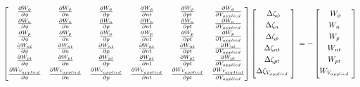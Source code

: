 \documentclass[11pt]{article}
\begin{document}
\begin{equation}
\begin{bmatrix}
\frac{\partial W_{\phi}}{\partial \phi} &
\frac{\partial W_{\phi}}{\partial n} &
\frac{\partial W_{\phi}}{\partial p} &
\frac{\partial W_{\phi}}{\partial nt} &
\frac{\partial W_{\phi}}{\partial pt} &
\frac{\partial W_{\phi}}{\partial V_{applied}} \\[0.3em]
\frac{\partial W_{n}}{\partial \phi} &
\frac{\partial W_{n}}{\partial n} &
\frac{\partial W_{n}}{\partial p} &
\frac{\partial W_{n}}{\partial nt} &
\frac{\partial W_{n}}{\partial pt} &
\frac{\partial W_{n}}{\partial V_{applied}} \\[0.3em]
\frac{\partial W_{p}}{\partial \phi} &
\frac{\partial W_{p}}{\partial n} &
\frac{\partial W_{p}}{\partial p} &
\frac{\partial W_{p}}{\partial nt} &
\frac{\partial W_{p}}{\partial pt} &
\frac{\partial W_{p}}{\partial V_{applied}} \\[0.3em]
\frac{\partial W_{nt}}{\partial \phi} &
\frac{\partial W_{nt}}{\partial n} &
\frac{\partial W_{nt}}{\partial p} &
\frac{\partial W_{nt}}{\partial nt} &
\frac{\partial W_{nt}}{\partial pt} &
\frac{\partial W_{nt}}{\partial V_{applied}} \\[0.3em]
\frac{\partial W_{pt}}{\partial \phi} &
\frac{\partial W_{pt}}{\partial n} &
\frac{\partial W_{pt}}{\partial p} &
\frac{\partial W_{pt}}{\partial nt} &
\frac{\partial W_{pt}}{\partial pt} &
\frac{\partial W_{pt}}{\partial V_{applied}} \\[0.3em]
\frac{\partial W_{V_{applied}}}{\partial \phi} &
\frac{\partial W_{V_{applied}}}{\partial n} &
\frac{\partial W_{V_{applied}}}{\partial p} &
\frac{\partial W_{V_{applied}}}{\partial nt} &
\frac{\partial W_{V_{applied}}}{\partial pt} &
\frac{\partial W_{V_{applied}}}{\partial V_{applied}} \\[0.3em]
\end{bmatrix}
\begin{bmatrix}
\Delta \zeta_\phi \\[0.3em]
\Delta \zeta_{n}\ \\[0.3em]
\Delta \zeta_{p}\ \\[0.3em]
\Delta \zeta_{nt}\ \\[0.3em]
\Delta \zeta_{pt}\ \\[0.3em]
\Delta \zeta_{V_{applied}}\ \\[0.3em]
\end{bmatrix}
\\
=-
\begin{bmatrix}
W_\phi \\[0.3em]
W_{n}\ \\[0.3em]
W_{p}\ \\[0.3em]
W_{nt}\ \\[0.3em]
W_{pt}\ \\[0.3em]
W_{V_{applied}}\ \\[0.3em]
\end{bmatrix}
\end{equation}
\end{document}
